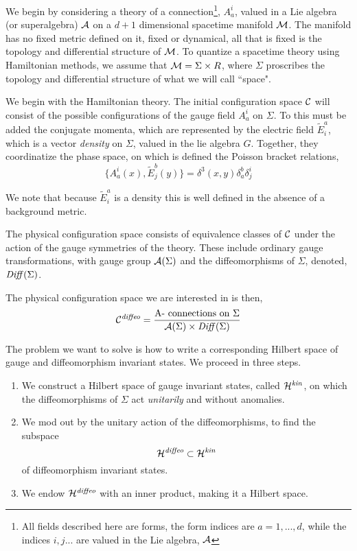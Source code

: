 \documentclass[12pt]{article}
\newcommand{\f}{\begin{equation}}
\newcommand{\ff}{\end{equation}}
\begin{document}
We begin  by  considering a theory of a 
connection\footnote{All fields described here are forms, the form 
indices are $a=1,...,d$, while the indices $i,j...$ are 
valued in the Lie algebra, $\cal A$},  $A^i_a$, valued in a Lie algebra (or superalgebra)  
$\cal A$ on a $d+1$ dimensional spacetime manifold $\cal M$.   The manifold has
no fixed metric defined on it, fixed or dynamical, all that is fixed is the topology
and differential structure of $\cal M$.  
To quantize a spacetime theory using Hamiltonian methods, we assume that
${\cal M} = \Sigma \times R$, where $\Sigma$ proscribes  the  topology and
differential structure of what we will call ``space".    

We begin with the Hamiltonian theory.  The initial configuration space $\cal C$ will
consist of the possible configurations of the gauge field $A^i_a$ on $\Sigma$. 
To this must be added the conjugate momenta, which are represented by 
the electric field  $\tilde{E}^a_i$, which 
is a vector {\it density}  on $\Sigma$, valued in the lie algebra $G$.  Together, they
coordinatize the phase space, on which is defined
the Poisson bracket relations,
\f
\{ A_a^i  (x) , \tilde{E}^b_j  (y) \} = \delta^3 (x,y) \delta_a^b \delta_j^i
\label{ccr}
\ff

We note that because $\tilde{E}^a_i$ is a density this is well defined 
in the absence of a background metric. 

The physical configuration space consists of 
 equivalence classes of $\cal C$ under the action of  the gauge symmetries
of the theory. These include 
ordinary gauge transformations, with gauge group ${\cal A}(\Sigma )$ 
and the diffeomorphisms of $\Sigma$, denoted, ${\it Diff} (\Sigma )$. 

The physical configuration space we are interested in is then,
\f
{\cal C}^{\it diffeo} = \frac{\mbox{{\cal A}- connections on}  \ \Sigma}{{\cal A}(\Sigma ) 
\times {\it Diff} (\Sigma )}
\ff

The problem we want to solve is how to write a corresponding Hilbert 
space of gauge and diffeomorphism invariant states. We proceed in three 
steps. 

\begin{enumerate}

\item{} We construct a Hilbert space of gauge invariant states, called
${\cal H}^{\it kin}$, on which the diffeomorphisms of $\Sigma$ act {\it 
unitarily} and without anomalies.  

\item{} We mod out by the unitary 
action of the diffeomorphisms, to find the subspace 
\f
{\cal H}^{\it diffeo} \subset {\cal H}^{\it kin}
\ff
of diffeomorphism invariant states.  

\item{} We endow ${\cal H}^{\it diffeo}$ with
an inner product, making it a Hilbert space. 

\end{enumerate}
\end{document}
